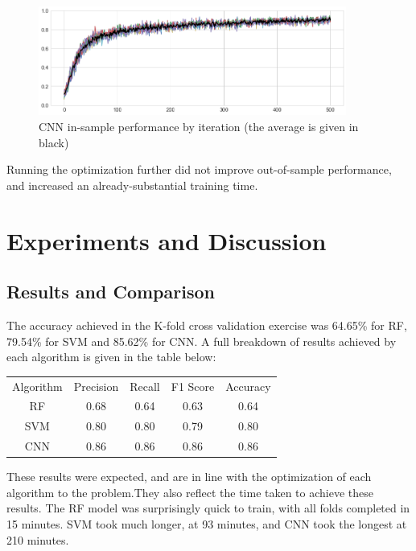 \documentclass[12pt]{article}
\begin{document}
\begin{figure}[h]
  \caption{CNN in-sample performance by iteration (the average is given in black)}
  \label{img:cnntraining}
\centering
\includegraphics[width=0.9\textwidth]{images/training-progress.png}
\end{figure}

Running the optimization further did not improve out-of-sample performance, and increased an already-substantial training time.\\

\newpage
\section{Experiments and Discussion}
\subsection{Results and Comparison}

The accuracy achieved in the K-fold cross validation exercise was 64.65\% for RF, 79.54\% for SVM and 85.62\% for CNN. A full breakdown of results achieved by each algorithm is given in the table below:\\
\begin{center}
\begin{tabular}{ c c c c c }
 Algorithm & Precision & Recall & F1 Score & Accuracy\\ 
 RF & 0.68 & 0.64 & 0.63 & 0.64 \\  
SVM & 0.80 & 0.80 & 0.79 & 0.80\\
CNN & 0.86 & 0.86 & 0.86 & 0.86                    
\end{tabular}
\end{center}

These results were expected, and are in line with the optimization of each algorithm to the problem.They also reflect the time taken to achieve these results. The RF model was surprisingly quick to train, with all folds completed in 15 minutes. SVM took much longer, at 93 minutes, and CNN took the longest at 210 minutes.\\
\end{document}
